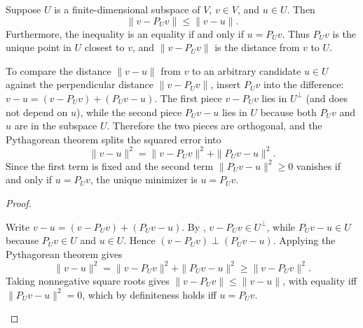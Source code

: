 \documentclass[10pt]{scrartcl}
\begin{document}
\begin{theorem*}
  Suppose $U$ is a finite-dimensional subspace of $V$, $v\in V$, and $u\in U$. Then
  \[
    \|v - P_U v\| \le \|v - u\|.
  \]
  Furthermore, the inequality is an equality if and only if $u = P_U v$. Thus $P_U v$ is the unique point in $U$ closest to $v$, and $\|v-P_U v\|$ is the distance from $v$ to $U$.
\end{theorem*}
\begin{ideabox}
  To compare the distance $\|v-u\|$ from $v$ to an arbitrary candidate $u\in U$ against the perpendicular distance $\|v-P_U v\|$, insert $P_U v$ into the difference: $v-u=(v-P_U v)+(P_U v-u)$. The first piece $v-P_U v$ lies in $U^\perp$ (and does not depend on $u$), while the second piece $P_U v-u$ lies in $U$ because both $P_U v$ and $u$ are in the subspace $U$. Therefore the two pieces are orthogonal, and the Pythagorean theorem splits the squared error into
  \[
    \|v-u\|^2 = \|v-P_U v\|^2 + \|P_U v-u\|^2.
  \]
  Since the first term is fixed and the second term $\|P_U v-u\|^2\ge 0$ vanishes if and only if $u=P_U v$, the unique minimizer is $u=P_U v$.
\end{ideabox}
\begin{proof}
  \begin{steps}
    \ii Write $v-u = (v-P_U v) + (P_U v-u)$. By , $v-P_U v\in U^\perp$, while $P_U v-u\in U$ because $P_U v\in U$ and $u\in U$.
    \ii Hence $(v-P_U v)\perp(P_U v-u)$. Applying the Pythagorean theorem gives
    \[
      \|v-u\|^2 = \|v-P_U v\|^2 + \|P_U v-u\|^2 \ge \|v-P_U v\|^2.
    \]
    \ii Taking nonnegative square roots gives $\|v-P_U v\|\le\|v-u\|$, with equality iff $\|P_U v-u\|^2=0$, which by definiteness holds iff $u=P_U v$.
  \end{steps}
\end{proof}
\end{document}
